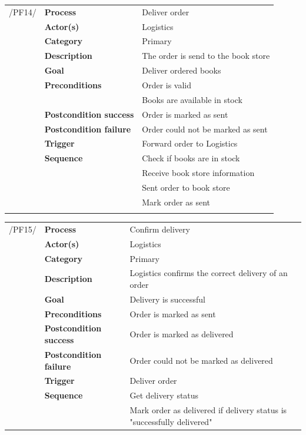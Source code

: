 \documentclass[11pt,a4paper,oneside,svgnames]{report}
\begin{document}
\noindent
\begin{tabular}{p{1.5cm}p{3cm}p{8cm}}
/PF14/	& \textbf{Process} & Deliver order\\
		& \textbf{Actor(s)} & Logistics\\
		& \textbf{Category} & Primary\\
		& \textbf{Description}	 &  The order is send to the book store\\
		& \textbf{Goal} & Deliver ordered books\\
		& \textbf{Preconditions} & Order is valid\\
		& & Books are available in stock\\
		& \textbf{Postcondition success} & Order is marked as sent\\
		& \textbf{Postcondition failure} & Order could not be marked as sent\\
		& \textbf{Trigger} & Forward order to Logistics\\
		& \textbf{Sequence} & Check if books are in stock\\
		& & Receive book store information\\
		& & Sent order to book store\\
		& & Mark order as sent\\
		
\hfill \\
\end{tabular}

\noindent
\begin{tabular}{p{1.5cm}p{3cm}p{8cm}}
/PF15/	& \textbf{Process} & Confirm delivery\\
		& \textbf{Actor(s)} & Logistics\\
		& \textbf{Category} & Primary\\
		& \textbf{Description}	 & Logistics confirms the correct delivery of an order\\
		& \textbf{Goal} & Delivery is successful\\
		& \textbf{Preconditions} & Order is marked as sent\\
		& \textbf{Postcondition success} & Order is marked as delivered\\
		& \textbf{Postcondition failure} & Order could not be marked as delivered\\
		& \textbf{Trigger} & Deliver order\\
		& \textbf{Sequence} & Get delivery status\\
		& & Mark order as delivered if delivery status is "successfully delivered"
		
\hfill \\
\end{tabular}
\end{document}
